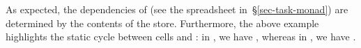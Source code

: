 \noindent
As expected, the dependencies of  (see the spreadsheet
in~\S\ref{sec-task-monad}) are determined by the contents of the store.
Furthermore, the above example highlights the static cycle between cells
 and : in , we have ,
whereas in , we have .

%
%


